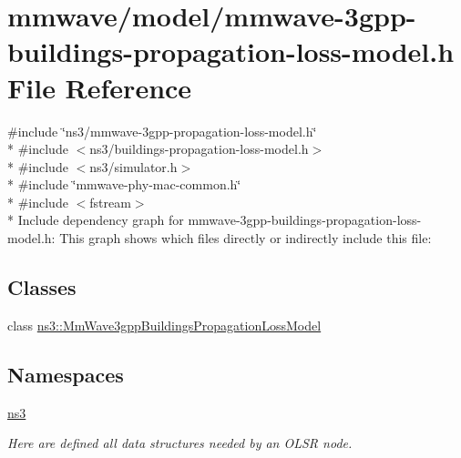 \hypertarget{mmwave-3gpp-buildings-propagation-loss-model_8h}{}\section{mmwave/model/mmwave-\/3gpp-\/buildings-\/propagation-\/loss-\/model.h File Reference}
\label{mmwave-3gpp-buildings-propagation-loss-model_8h}
{\ttfamily \#include \char`\"{}ns3/mmwave-\/3gpp-\/propagation-\/loss-\/model.\+h\char`\"{}}\\*
{\ttfamily \#include $<$ns3/buildings-\/propagation-\/loss-\/model.\+h$>$}\\*
{\ttfamily \#include $<$ns3/simulator.\+h$>$}\\*
{\ttfamily \#include \char`\"{}mmwave-\/phy-\/mac-\/common.\+h\char`\"{}}\\*
{\ttfamily \#include $<$fstream$>$}\\*
Include dependency graph for mmwave-\/3gpp-\/buildings-\/propagation-\/loss-\/model.h\+:
This graph shows which files directly or indirectly include this file\+:
\subsection*{Classes}
\begin{DoxyCompactItemize}
\item 
class \hyperlink{classns3_1_1MmWave3gppBuildingsPropagationLossModel}{ns3\+::\+Mm\+Wave3gpp\+Buildings\+Propagation\+Loss\+Model}
\end{DoxyCompactItemize}
\subsection*{Namespaces}
\begin{DoxyCompactItemize}
\item 
 \hyperlink{namespacens3}{ns3}
\begin{DoxyCompactList}\small\item\em Here are defined all data structures needed by an O\+L\+SR node. \end{DoxyCompactList}\end{DoxyCompactItemize}
